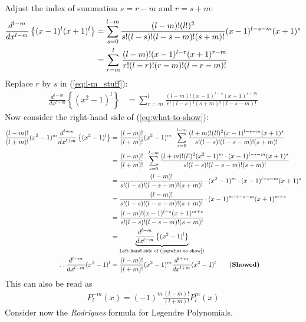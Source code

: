 \begin{enumerate}
\begin{align*}
        \end{align*}
        Adjust the index of summation $\displaystyle s = r - m$ and $r = s + m$:
        \begin{align}
            \frac{d^{l-m}}{dx^{l-m}} \left\{(x-1)^l (x+1)^l\right\}&= \sum_{s=0}^{l-m} \frac{(l-m)!(l!)^2}{s!(l-s)!(l-s-m)!(s+m)!} (x-1)^{l-s-m} (x+1)^s\notag\\
            &= \sum_{r=m}^{l} \frac{(l-m)!(x-1)^{l-r} (x+1)^{r-m}}{r!(l-r)!(r-m)!(l-r-m)!} \label{eq:l-m_stuff}
        \end{align}
        Replace $r$ by $s$ in (\ref{eq:l-m_stuff}):
        \begin{align}
            \frac{d^{l-m}}{dx^{l-m}} \left\{\left(x^2-1\right)^l\right\} &= \sum_{r=m}^{l} \frac{(l-m)!(x-1)^{l-s} (x+1)^{s+m}}{r!(l-s)!(s+m)!(l-s-m)!}
        \end{align}
        Now consider the right-hand side of (\ref{eq:what-to-show}):
        \begin{align*}
            \frac{(l-m)!}{(l+m)!}(x^2-1)^m\frac{d^{l+m}}{dx^{l+m}}\left\{(x^2 - 1)^l\right\}&=\frac{(l-m)!}{(l+m)!}(x^2-1)^m\cdot\sum_{s=0}^{l-m} \frac{(l+m)!(l!)^2(x-1)^{l-s-m}(x+1)^s}{s!(l-s)!(l-s-m)!(s+m)!}\notag\\
            &= \frac{(l-m)!}{(l+m)!} \cdot \sum_{s=0}^{l-m} \frac{(l+m)!(l!)^2(x^2-1)^m \cdot (x-1)^{l-s-m} (x+1)^s}{s!(l-s)!(l-s-m)!(s+m)!} \notag\\
            &= \frac{(l-m)!}{s!(l-s)!(l-s-m)!(s+m)!} \cdot (x^2-1)^m \cdot (x-1)^{l-s-m} (x+1)^s\notag\\
            &= \frac{(l-m)!}{s!(l-s)!(l-s-m)!(s+m)!} \cdot (x-1)^{m + l-s-m} (x+1)^{m + s} \notag\\
            &= \frac{(l-m)!(x-1)^{l-s} (x+1)^{m+s}}{s!(l-s)!(l-s-m)!(s+m)!}\notag\\
            &=\underbrace{\frac{d^{l-m}}{dx^{l-m}} \left\{(x^2 - 1)^l\right\}}_{\text{Left-hand side of (\ref{eq:what-to-show})}}\notag\\
            \therefore\frac{d^{l-m}}{dx^{l-m}} (x^2 - 1)^l &= \frac{(l-m)!}{(l+m)!} (x^2 - 1)^m \frac{d^{l+m}}{dx^{l+m}} (x^2 - 1)^l\qquad\text{(\bf Showed)}
        \end{align*}
        This can also be read as 
        \begin{align}
            P_l^{-m}(x)=(-1)^m\frac{(l-m)!}{(l+m)!}P_l^m(x)
        \end{align}
        Consider now the \textit{Rodrigues} formula for Legendre Polynomials.
        \begin{align}

\end{align}
\end{enumerate}

